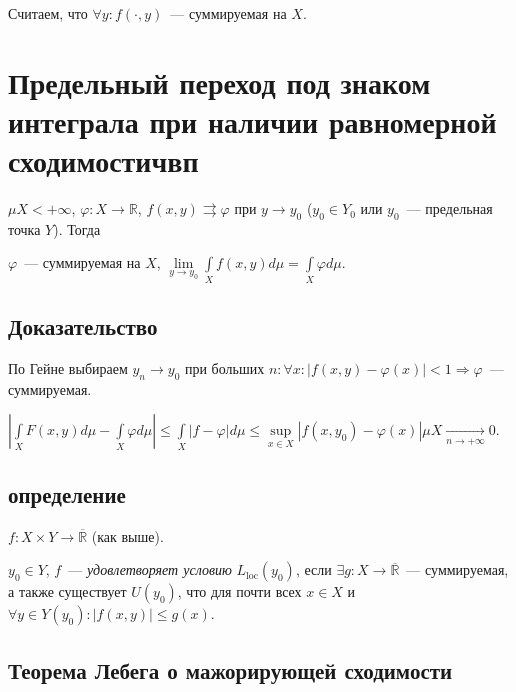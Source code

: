 \documentclass{article}
\begin{document}
    Считаем, что $\forall y : f( \cdot, y )$~--- суммируемая на $X$.
    
    \newpage
    
    \section{Предельный переход под знаком интеграла при наличии равномерной сходимостичвп}
    
        $\mu X < +\infty$, $\varphi : X \rightarrow \mathbb{R}$, $f(x, y) \rightrightarrows \varphi$ при $y \rightarrow y_0$ ($y_0 \in Y_0$ или $y_0$~--- предельная точка $Y$). Тогда
        
        $\varphi$~--- суммируемая на $X$, $\lim\limits_{y \rightarrow y_0} \int\limits_X f(x, y) d \mu = \int\limits_X \varphi d \mu$.
        
        \subsection{Доказательство}
        
            По Гейне выбираем $y_n \rightarrow y_0$ при больших $n : \forall x : \left| f(x, y) - \varphi(x) \right| < 1 \Rightarrow \varphi$~--- суммируемая.
        
            $\left| \int\limits_X F(x, y) d \mu - \int\limits_X \varphi d \mu \right| \leqslant \int\limits_X | f - \varphi | d \mu \leqslant \sup\limits_{x \in X} \left| f (x, y_0) - \varphi(x) \right| \mu X \xrightarrow[n \rightarrow +\infty]{} 0$. 
    
    \newpage
    
    \subsection{определение}
    
        $f : X \times Y \rightarrow \overline{\mathbb{R}}$ (как выше).
        
        $y_0 \in Y$, $f$~--- \textit{удовлетворяет условию} $L_{\mathrm{loc}}(y_0)$, если $\exists g : X \rightarrow \overline{\mathbb{R}}$~--- суммируемая, а также существует $U(y_0)$, что для почти всех $x \in X$ и $\forall y \in Y(y_0) : \left| f(x, y) \right| \leqslant g(x)$.
        
    \newpage
    
    \subsection{Теорема Лебега о мажорирующей сходимости}
    
\end{document}
